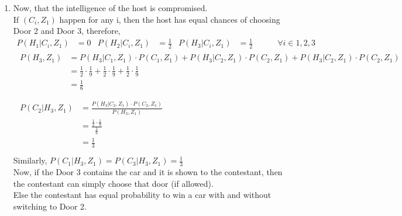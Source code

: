 \documentclass[11pt]{article}
\begin{document}
\begin{enumerate}[label=(\alph*)]
    \item
          Now, that the intelligence of the host is compromised.\\
          If $(C_i, Z_1)$ happen for any i, then the host has equal chances of choosing Door 2 and Door 3, therefore,
          \begin{align*}
              P(H_1|C_i,Z_1) & = 0 & P(H_2|C_i,Z_1) & = \frac{1}{2} & P(H_3|C_i,Z_1) & = \frac{1}{2} \hspace{3em} \forall i \in {1, 2, 3}
          \end{align*}
          \begin{align*}
              \begin{split}
                  P(H_3, Z_1) &= P(H_3|C_1,Z_1) \cdot P(C_1,Z_1) + P(H_3|C_2,Z_1) \cdot P(C_2,Z_1) + P(H_3|C_2,Z_1) \cdot P(C_2,Z_1) \\
                  &= \frac{1}{2} \cdot \frac{1}{9} + \frac{1}{2} \cdot \frac{1}{9} + \frac{1}{2} \cdot \frac{1}{9} \\
                  &= \frac{1}{6}
              \end{split} \\\\
              \begin{split}
                  P(C_2|H_3, Z_1) &= \frac{P(H_3|C_2, Z_1) \cdot P(C_2, Z_1)}{P(H_3, Z_1)} \\
                  &= \frac{\frac{1}{2} \cdot \frac{1}{9}}{\frac{1}{6}} \\
                  &= \frac{1}{3} \\
              \end{split}
          \end{align*}
          Similarly, $P(C_1|H_3, Z_1) = P(C_3|H_3, Z_1) = \frac{1}{3}$\\
          Now, if the Door 3 contains the car and it is shown to the contestant, then the contestant can simply choose that door (if allowed).\\
          Else the contestant has equal probability to win a car with and without switching to Door 2.

\end{enumerate}



\newpage
\end{document}
